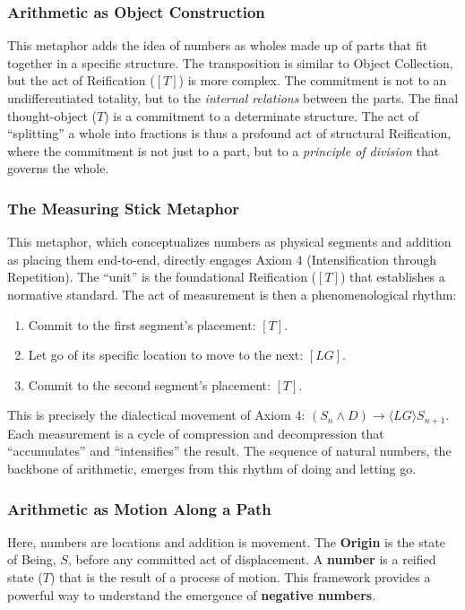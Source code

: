 \documentclass[12pt]{book}
\begin{document}
\subsubsection{Arithmetic as Object Construction}

This metaphor adds the idea of numbers as wholes made up of parts that fit together in a specific structure. The transposition is similar to Object Collection, but the act of Reification ($[T]$) is more complex. The commitment is not to an undifferentiated totality, but to the \textit{internal relations} between the parts. The final thought-object ($T$) is a commitment to a determinate structure. The act of ``splitting'' a whole into fractions is thus a profound act of structural Reification, where the commitment is not just to a part, but to a \textit{principle of division} that governs the whole.

\subsubsection{The Measuring Stick Metaphor}

This metaphor, which conceptualizes numbers as physical segments and addition as placing them end-to-end, directly engages Axiom 4 (Intensification through Repetition). The ``unit'' is the foundational Reification ($[T]$) that establishes a normative standard. The act of measurement is then a phenomenological rhythm:
\begin{enumerate}
 \item Commit to the first segment's placement: $[T]$.
 \item Let go of its specific location to move to the next: $[LG]$.
 \item Commit to the second segment's placement: $[T]$.
\end{enumerate}
This is precisely the dialectical movement of Axiom 4: $(S_n \land D) \rightarrow \langle LG \rangle S_{n+1}$. Each measurement is a cycle of compression and decompression that ``accumulates'' and ``intensifies'' the result. The sequence of natural numbers, the backbone of arithmetic, emerges from this rhythm of doing and letting go.

\subsubsection{Arithmetic as Motion Along a Path}

Here, numbers are locations and addition is movement. The \textbf{Origin} is the state of Being, $S$, before any committed act of displacement. A \textbf{number} is a reified state ($T$) that is the result of a process of motion. This framework provides a powerful way to understand the emergence of \textbf{negative numbers}.
\end{document}
